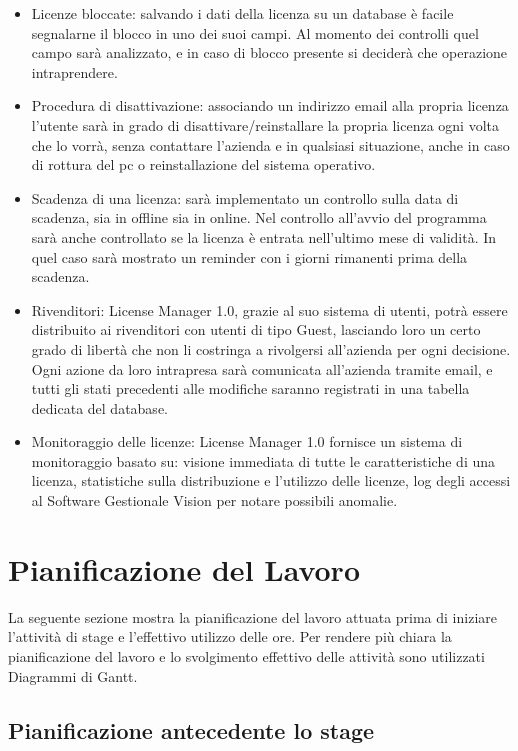 \begin{itemize}
\item	Licenze bloccate: salvando i dati della licenza su un database è facile segnalarne il blocco in uno dei suoi campi. Al momento dei controlli quel campo sarà analizzato, e in caso di blocco presente si deciderà che operazione intraprendere. 
\item	Procedura di disattivazione: associando un indirizzo email alla propria licenza l’utente sarà in grado di disattivare/reinstallare la propria licenza ogni volta che lo vorrà, senza contattare l’azienda e in qualsiasi situazione, anche in caso di rottura del pc o reinstallazione del sistema operativo.
\item	Scadenza di una licenza: sarà implementato un controllo sulla data di scadenza, sia in offline sia in online. Nel controllo all’avvio del programma sarà anche controllato se la licenza è entrata nell’ultimo mese di validità. In quel caso sarà mostrato un reminder con i giorni rimanenti prima della scadenza. 
\item	Rivenditori: License Manager 1.0, grazie al suo sistema di utenti, potrà essere distribuito ai rivenditori con utenti di tipo Guest, lasciando loro un certo grado di libertà che non li costringa a rivolgersi all’azienda per ogni decisione. Ogni azione da loro intrapresa sarà comunicata all’azienda tramite email, e tutti gli stati precedenti alle modifiche saranno registrati in una tabella dedicata del database.
\item	Monitoraggio delle licenze: License Manager 1.0 fornisce un sistema di monitoraggio basato su: visione immediata di tutte le caratteristiche di una licenza, statistiche sulla distribuzione e l’utilizzo delle licenze, log degli accessi al Software Gestionale Vision per notare possibili anomalie.


\end{itemize}

\section{Pianificazione del Lavoro}

La seguente sezione mostra la pianificazione del lavoro attuata prima di iniziare l'attività di stage e l'effettivo utilizzo delle ore. Per rendere più chiara la pianificazione del lavoro e lo svolgimento effettivo delle attività sono utilizzati Diagrammi di Gantt.

\subsection{Pianificazione antecedente lo stage}

